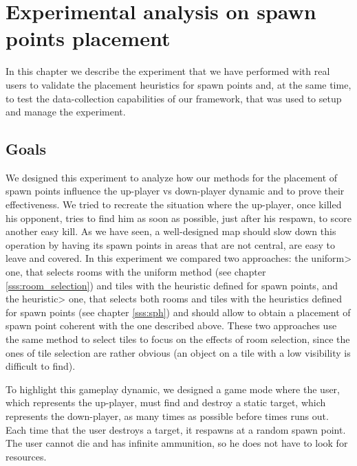 \chapter{Experimental analysis on spawn points placement}


In this chapter we describe the experiment that we have performed with real users to validate the placement heuristics for spawn points and, at the same time, to test the data-collection capabilities of our framework, that was used to setup and manage the experiment.


\section{Goals}

We designed this experiment to analyze how our methods for the placement of spawn points influence the up-player vs down-player dynamic and to prove their effectiveness. We tried to recreate the situation where the up-player, once killed his opponent, tries to find him as soon as possible, just after his respawn, to score another easy kill. As we have seen, a well-designed map should slow down this operation by having its spawn points in areas that are not central, are easy to leave and covered. In this experiment we compared two approaches: the \<uniform> one, that selects rooms with the uniform method (see chapter \ref{sss:room_selection}) and tiles with the heuristic defined for spawn points, and the \<heuristic> one, that selects both rooms and tiles with the heuristics defined for spawn points (see chapter \ref{sss:sph}) and should allow to obtain a placement of spawn point coherent with the one described above. These two approaches use the same method to select tiles to focus on the effects of room selection, since the ones of tile selection are rather obvious (an object on a tile with a low visibility is difficult to find).

\par

To highlight this gameplay dynamic, we designed a game mode where the user, which represents the up-player, must find and destroy a static target, which represents the down-player, as many times as possible before times runs out. Each time that the user destroys a target, it respawns at a random spawn point. The user cannot die and has infinite ammunition, so he does not have to look for resources.

